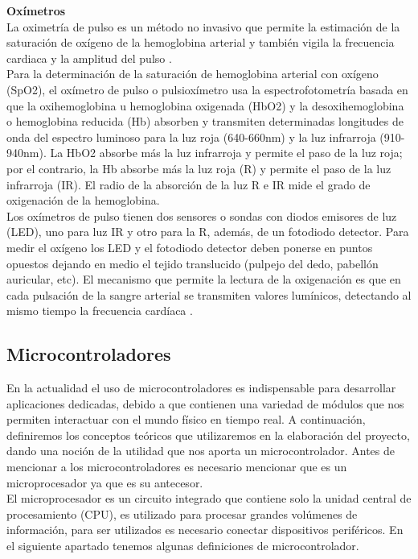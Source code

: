 \textbf{Oxímetros} \\

La oximetría de pulso es un método no invasivo que permite la estimación de la saturación de oxígeno de la hemoglobina arterial y también vigila la frecuencia cardiaca y la amplitud del pulso \cite{veintisiete}. \\

Para la determinación de la saturación de hemoglobina arterial con oxígeno (SpO2), el oxímetro de pulso o pulsioxímetro usa la espectrofotometría basada en que la oxihemoglobina u hemoglobina oxigenada (HbO2) y la desoxihemoglobina o hemoglobina reducida (Hb) absorben y transmiten determinadas longitudes de onda del espectro luminoso para la luz roja (640-660nm) y la luz infrarroja (910-940nm). La HbO2 absorbe más la luz infrarroja y permite el paso de la luz roja; por el contrario, la Hb absorbe más la luz roja (R) y permite el paso de la luz infrarroja (IR). El radio de la absorción de la luz R e IR mide el grado de oxigenación de la hemoglobina. \\

Los oxímetros de pulso tienen dos sensores o sondas con diodos emisores de luz (LED), uno para luz IR y otro para la R, además, de un fotodiodo detector. Para medir el oxígeno los LED y el fotodiodo detector deben ponerse en puntos opuestos dejando en medio el tejido translucido (pulpejo del dedo, pabellón auricular, etc). El mecanismo que permite la lectura de la oxigenación es que en cada pulsación de la sangre arterial se transmiten valores lumínicos, detectando al mismo tiempo la frecuencia cardíaca \cite{veintiocho}. 

\subsection{Microcontroladores}

En la actualidad el uso de microcontroladores es indispensable para desarrollar aplicaciones dedicadas, debido a que contienen una variedad de módulos que nos permiten interactuar con el mundo físico en tiempo real. A continuación, definiremos los conceptos teóricos que utilizaremos en la elaboración del proyecto, dando una noción de la utilidad que nos aporta un microcontrolador. Antes de mencionar a los microcontroladores es necesario mencionar que es un microprocesador ya que es su antecesor. \\

El microprocesador es un circuito integrado que contiene solo la unidad central de procesamiento (CPU), es utilizado para procesar grandes volúmenes de información, para ser utilizados es necesario conectar dispositivos periféricos.
En el siguiente apartado tenemos algunas definiciones de microcontrolador. \\

